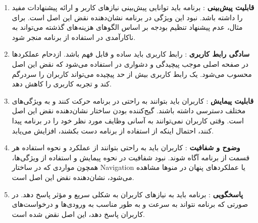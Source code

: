 \begin{enumerate}
	\item \textbf{قابلیت پیش‌بینی }: برنامه باید توانایی پیش‌بینی نیازهای کاربر و ارائه پیشنهادات مفید را داشته باشد. نبود این ویژگی در برنامه نشان‌دهنده نقض این اصل است. برای مثال، عدم پیشنهاد تنظیم بودجه بر اساس الگوهای هزینه‌های گذشته می‌تواند به ناکارآمدی در استفاده از برنامه منجر شود.
	
	\item \textbf{سادگی رابط کاربری }: رابط کاربری باید ساده و قابل فهم باشد. ازدحام عملکردها در صفحه اصلی موجب پیچیدگی و دشواری در استفاده می‌شود که نقض این اصل محسوب می‌شود. یک رابط کاربری بیش از حد پیچیده می‌تواند کاربران را سردرگم کند و تجربه کاربری را کاهش دهد.
	
	\item \textbf{قابلیت پیمایش }: کاربران باید بتوانند به راحتی در برنامه حرکت کنند و به ویژگی‌های مختلف دسترسی داشته باشند. گیج‌کننده بودن ساختار 
	نشان‌دهنده نقض این اصل است. وقتی کاربران نمی‌توانند به آسانی وظایف مورد نظر خود را در برنامه پیدا کنند، احتمال اینکه از استفاده از برنامه دست بکشند، افزایش می‌یابد.
	
	\item \textbf{وضوح و شفافیت }: کاربران باید به راحتی بتوانند از عملکرد و نحوه استفاده هر قسمت از برنامه آگاه شوند. نبود شفافیت در نحوه پیمایش و استفاده از ویژگی‌ها، همچون مواردی که در ساختار Navigation یا عملکردهای پنهان در منوها مشاهده می‌شود، نشان‌دهنده نقض این اصل است.
	
	\item \textbf{پاسخگویی }: برنامه باید به نیازهای کاربران به شکلی سریع و مؤثر پاسخ دهد. در صورتی که برنامه نتواند به سرعت و به طور مناسب به ورودی‌ها و درخواست‌های کاربران پاسخ دهد، این اصل نقض شده است.
\end{enumerate}
